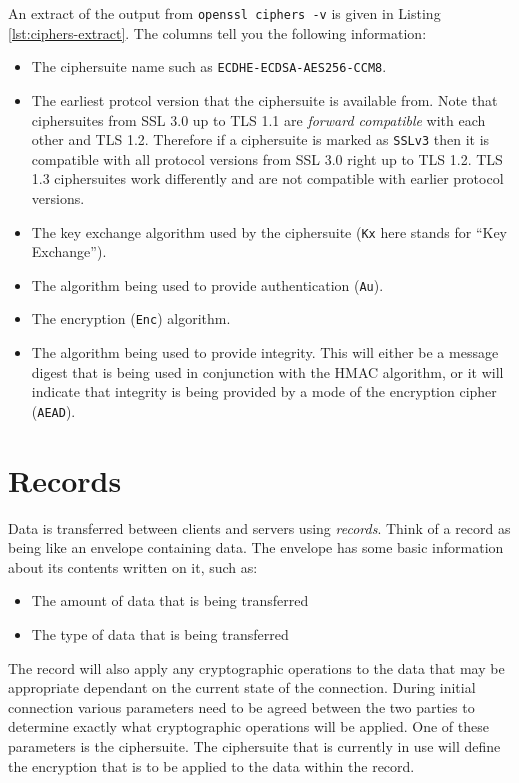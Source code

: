 An extract of the output from \lstinline!openssl ciphers -v! is given in 
Listing \ref{lst:ciphers-extract}. The columns tell you the following
information:
\begin{itemize}
\item The ciphersuite name such as \lstinline!ECDHE-ECDSA-AES256-CCM8!.
\item The earliest protcol version that the ciphersuite is available from. Note 
that ciphersuites from SSL 3.0 up to TLS 1.1 are \emph{forward compatible} with
each other and TLS 1.2. Therefore if a ciphersuite is marked as
\lstinline!SSLv3! then it is compatible with all protocol versions from SSL 3.0
right up to TLS 1.2. TLS 1.3 ciphersuites work differently and are not
compatible with earlier protocol versions.
\item The key exchange algorithm used by the ciphersuite (\lstinline!Kx! here 
stands for ``Key Exchange'').
\item The algorithm being used to provide authentication (\lstinline!Au!).
\item The encryption (\lstinline!Enc!) algorithm.
\item The algorithm being used to provide integrity. This will either be a 
message digest that is being used in conjunction with the HMAC algorithm, or it
will indicate that integrity is being provided by a mode of the encryption 
cipher (\lstinline!AEAD!).
\end{itemize}

\section{Records}

Data is transferred between clients and servers using \emph{records}. Think of 
a record as being like an envelope containing data. The envelope has some basic 
information about its contents written on it, such as:
\begin{itemize}
\item The amount of data that is being transferred
\item The type of data that is being transferred
\end{itemize}

The record will also apply any cryptographic operations to the data that may be 
appropriate dependant on the current state of the connection. During initial 
connection various parameters need to be agreed between the two parties to 
determine exactly what cryptographic operations will be applied. One of these 
parameters is the ciphersuite. The ciphersuite that is currently in use will 
define the encryption that is to be applied to the data within the record.

